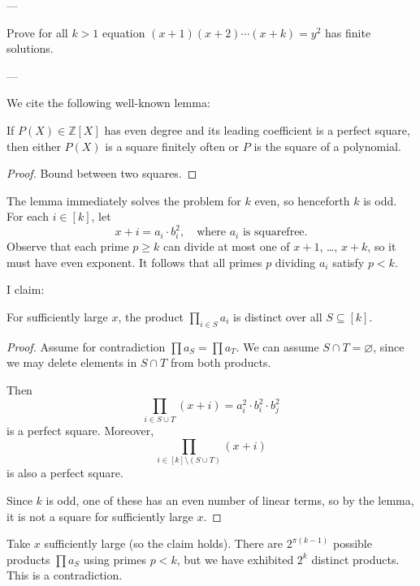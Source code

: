 
---

Prove for all $k>1$ equation $(x+1)(x+2)\cdots(x+k)=y^2$ has finite solutions.

---

We cite the following well-known lemma:
\begin{lemma*}
    If $P(X)\in\mathbb Z[X]$ has even degree and its leading coefficient is a perfect square, then either $P(X)$ is a square finitely often or $P$ is the square of a polynomial.
\end{lemma*}
\begin{proof}
    Bound between two squares.
\end{proof}

The lemma immediately solves the problem for $k$ even, so henceforth $k$ is odd. For each $i\in[k]$, let
\[x+i=a_i\cdot b_i^2,\quad\text{where }a_i\text{ is squarefree.}\]
Observe that each prime $p\ge k$ can divide at most one of $x+1$, \ldots, $x+k$, so it must have even exponent. It follows that all primes $p$ dividing $a_i$ satisfy $p<k$.

I claim:
\begin{claim*}
    For sufficiently large $x$, the product $\prod_{i\in S}a_i$ is distinct over all $S\subseteq[k]$.
\end{claim*}
\begin{proof}
    Assume for contradiction $\prod a_S=\prod a_T$. We can assume $S\cap T=\varnothing$, since we may delete elements in $S\cap T$ from both products.

    Then
    \[\prod_{i\in S\cup T}(x+i)=a_i^2\cdot b_i^2\cdot b_j^2\]
    is a perfect square. Moreover,
    \[\prod_{i\in[k]\setminus(S\cup T)}(x+i)\]
    is also a perfect square.

    Since $k$ is odd, one of these has an even number of linear terms, so by the lemma, it is not a square for sufficiently large $x$.
\end{proof}

Take $x$ sufficiently large (so the claim holds). There are $2^{\pi(k-1)}$ possible products $\prod a_S$ using primes $p<k$, but we have exhibited $2^k$ distinct products. This is a contradiction.
